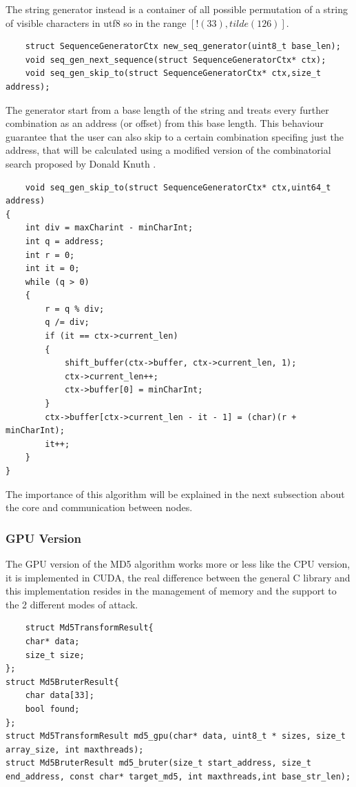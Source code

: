 \documentclass[12pt,a4paper]{article}
\begin{document}
The string generator instead is a container of all possible permutation of a string of visible characters in utf8 so in the range $ [!(33) , tilde (126)]$. 

\begin{lstlisting}
    struct SequenceGeneratorCtx new_seq_generator(uint8_t base_len);
    void seq_gen_next_sequence(struct SequenceGeneratorCtx* ctx);
    void seq_gen_skip_to(struct SequenceGeneratorCtx* ctx,size_t address);
\end{lstlisting}

The generator start from a base length of the string and treats every further combination as an address (or offset) from this base length. This behaviour guarantee that the user can also skip to a certain combination specifing just the address, that will be calculated using a modified version of the combinatorial search proposed by Donald Knuth \cite{artcp1}. 

\begin{lstlisting}
    void seq_gen_skip_to(struct SequenceGeneratorCtx* ctx,uint64_t address)
{
    int div = maxCharint - minCharInt;
    int q = address;
    int r = 0;
    int it = 0;
    while (q > 0)
    {
        r = q % div;
        q /= div;
        if (it == ctx->current_len)
        {
            shift_buffer(ctx->buffer, ctx->current_len, 1); 
            ctx->current_len++;
            ctx->buffer[0] = minCharInt;
        }
        ctx->buffer[ctx->current_len - it - 1] = (char)(r + minCharInt);
        it++;
    }
}

\end{lstlisting}

The importance of this algorithm will be explained in the next subsection about the core and communication between nodes. 

\subsubsection{GPU Version}
The GPU version of the MD5 algorithm works more or less like the CPU version, it is implemented in CUDA, the real difference between the general C library and this implementation resides in the management of memory and the support to the 2 different modes of attack.

\begin{lstlisting}
    struct Md5TransformResult{
    char* data;
    size_t size;
}; 
struct Md5BruterResult{
    char data[33];
    bool found;
};
struct Md5TransformResult md5_gpu(char* data, uint8_t * sizes, size_t array_size, int maxthreads);
struct Md5BruterResult md5_bruter(size_t start_address, size_t end_address, const char* target_md5, int maxthreads,int base_str_len);
\end{lstlisting}
\end{document}
